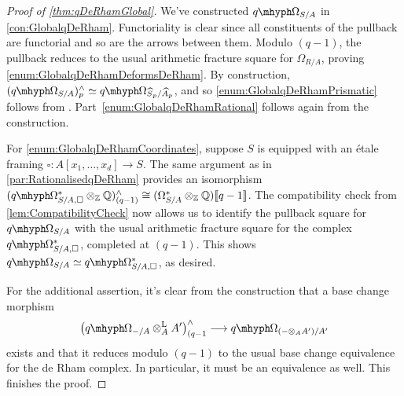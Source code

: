 \documentclass[DIV=12,numbers=enddot,leqno,bibliography=totoc]{scrartcl}
\begin{document}
	\begin{proof}[Proof of \cref{thm:qDeRhamGlobal}]
		We've constructed $\qOmega_{S/A}$ in \cref{con:GlobalqDeRham}. Functoriality is clear since all constituents of the pullback are functorial and so are the arrows between them. Modulo $(q-1)$, the pullback reduces to the usual arithmetic fracture square for $\Omega_{R/A}$, proving \cref{enum:GlobalqDeRhamDeformsDeRham}. By construction, $(\qOmega_{S/A})_p^\complete\simeq \qOmega_{\smash{\widehat{S}}_p/\smash{\widehat{A}}_p}$, and so \cref{enum:GlobalqDeRhamPrismatic} follows from \cite[Theorem~]{Prismatic}. Part~\cref{enum:GlobalqDeRhamRational} follows again from the construction.
		
		For \cref{enum:GlobalqDeRhamCoordinates}, suppose $S$ is equipped with an étale framing $\square\colon A[x_1,\dotsc,x_d]\rightarrow S$. The same argument as in \cref{par:RationalisedqDeRham} provides an isomorphism $(\qOmega_{S/A, \square}^*\otimes_{\IZ}\IQ)_{(q-1)}^\complete\cong (\Omega_{S/A}^*\otimes_{\IZ}\IQ)\qpower$. The compatibility check from \cref{lem:CompatibilityCheck} now allows us to identify the pullback square for $\qOmega_{S/A}$ with the usual arithmetic fracture square for the complex $\qOmega_{S/A, \square}^*$, completed at $(q-1)$. This shows $\qOmega_{S/A}\simeq \qOmega_{S/A, \square}^*$, as desired.
		
		For the additional assertion, it's clear from the construction that a base change morphism 
		\begin{equation*}
			\bigl(\qOmega_{-/A}\lotimes_{A}{A'}\bigr)_{(q-1}^\complete\longrightarrow \qOmega_{(-\otimes_AA')/A'}
		\end{equation*}
		exists and that it reduces modulo $(q-1)$ to the usual base change equivalence for the de Rham complex. In particular, it must be an equivalence as well. This finishes the proof.
	\end{proof}
\end{document}
